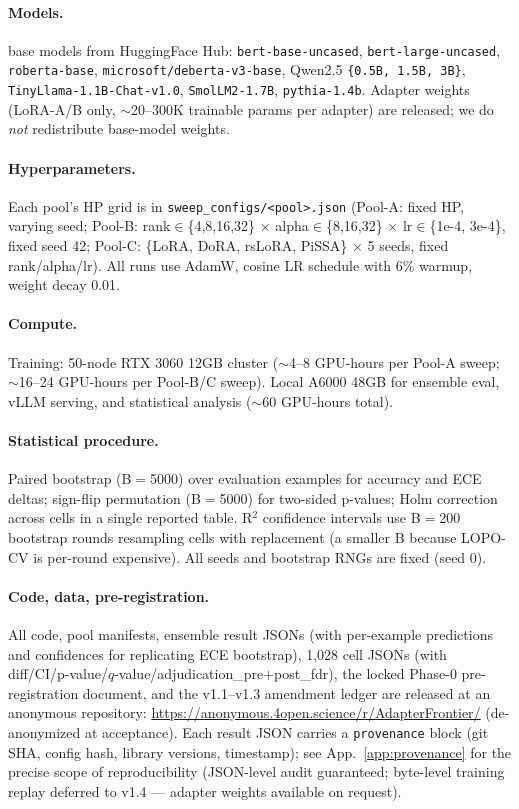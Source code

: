 \documentclass[11pt]{article}
\begin{document}
\paragraph{Models.} { base models from HuggingFace Hub: \texttt{bert-base-uncased}, \texttt{bert-large-uncased}, \texttt{roberta-base}, \texttt{microsoft/\allowbreak deberta-v3-base}, Qwen2.5 \texttt{\{0.5B, 1.5B, 3B\}}, \texttt{TinyLlama-1.1B-Chat-v1.0}, \texttt{SmolLM2-1.7B}, \texttt{pythia-1.4b}. Adapter weights (LoRA-A/B only, $\sim$20--300K trainable params per adapter) are released; we do \emph{not} redistribute base-model weights.\par}
\paragraph{Hyperparameters.} Each pool's HP grid is in \texttt{sweep\_\allowbreak configs/\allowbreak <pool>.\allowbreak json} (Pool-A: fixed HP, varying seed; Pool-B: rank$\in$\{4,8,16,32\} $\times$ alpha$\in$\{8,16,32\} $\times$ lr$\in$\{1e-4, 3e-4\}, fixed seed 42; Pool-C: \{LoRA, DoRA, rsLoRA, PiSSA\} $\times$ 5 seeds, fixed rank/alpha/lr). All runs use AdamW, cosine LR schedule with 6\% warmup, weight decay 0.01.
\paragraph{Compute.} Training: 50-node RTX 3060 12GB cluster ($\sim$4--8 GPU-hours per Pool-A sweep; $\sim$16--24 GPU-hours per Pool-B/C sweep). Local A6000 48GB for ensemble eval, vLLM serving, and statistical analysis ($\sim$60 GPU-hours total).
\paragraph{Statistical procedure.} Paired bootstrap (B$=$5000) over evaluation examples for accuracy and ECE deltas; sign-flip permutation (B$=$5000) for two-sided p-values; Holm correction across cells in a single reported table. R$^2$ confidence intervals use B$=$200 bootstrap rounds resampling cells with replacement (a smaller B because LOPO-CV is per-round expensive). All seeds and bootstrap RNGs are fixed (seed 0).
\paragraph{Code, data, pre-registration.} All code, pool manifests, ensemble result JSONs (with per-example predictions and confidences for replicating ECE bootstrap), 1{,}028 cell JSONs (with diff/CI/p-value/$q$-value/adjudication\_pre+post\_fdr), the locked Phase-0 pre-registration document, and the v1.1--v1.3 amendment ledger are released at an anonymous repository: \url{https://anonymous.4open.science/r/AdapterFrontier/} (de-anonymized at acceptance). Each result JSON carries a \texttt{provenance} block (git SHA, config hash, library versions, timestamp); see App.~\ref{app:provenance} for the precise scope of reproducibility (JSON-level audit guaranteed; byte-level training replay deferred to v1.4 — adapter weights available on request).
\end{document}
